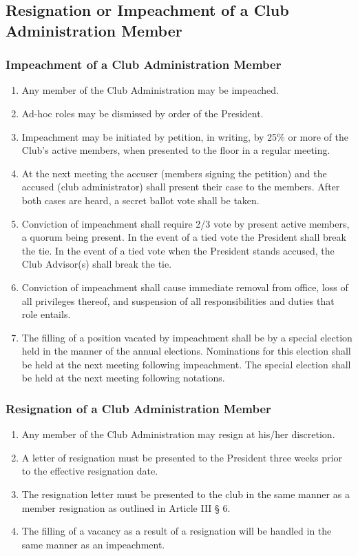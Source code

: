 \documentclass[english,11pt]{article}
\begin{document}
\subsection{Resignation or Impeachment of a Club Administration Member}
\subsubsection{Impeachment of a Club Administration Member}

\begin{enumerate}[label=\alph*.]
\item Any member of the Club Administration may be impeached.
\item Ad-hoc roles may be dismissed by order of the President.
\item Impeachment may be initiated by petition, in writing, by 25\% or more of the Club’s active members, when presented to the floor in a regular meeting.
\item At the next meeting the accuser (members signing the petition) and the accused (club administrator) shall present their case to the members.
      After both cases are heard, a secret ballot vote shall be taken.
\item Conviction of impeachment shall require 2/3 vote by present active members, a quorum being present.
      In the event of a tied vote the President shall break the tie.
      In the event of a tied vote when the President stands accused, the Club Advisor(s) shall break the tie.
\item Conviction of impeachment shall cause immediate removal from office, loss of all privileges thereof, and suspension of all responsibilities and duties that role entails.
\item The filling of a position vacated by impeachment shall be by a special election held in the manner of the annual elections.
      Nominations for this election shall be held at the next meeting following impeachment.
      The special election shall be held at the next meeting following notations.
\end{enumerate}

\subsubsection{Resignation of a Club Administration Member}

\begin{enumerate}[label=\alph*.]
\item Any member of the Club Administration may resign at his/her discretion.
\item A letter of resignation must be presented to the President three weeks prior to the effective resignation date.
\item The resignation letter must be presented to the club in the same manner as a member resignation as outlined in Article III § 6.
\item The filling of a vacancy as a result of a resignation will be handled in the same manner as an impeachment.
\end{enumerate}
\end{document}
